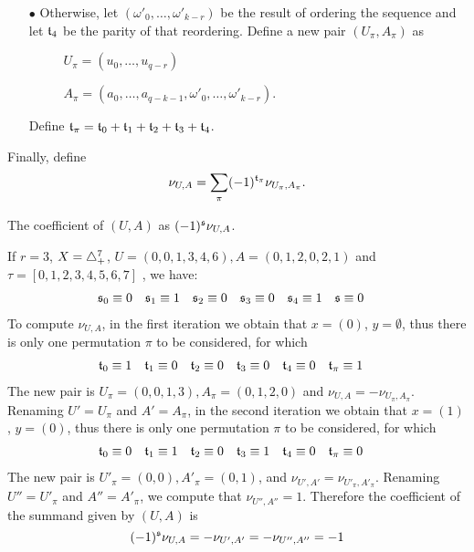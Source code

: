 \begin{itemize}
\begin{itemize}
\begin{itemize}
	\item[$\bullet$] Otherwise, let $(\omega'_0,\dots,\omega'_{k-r})$ be the result of ordering the sequence and let $\mathfrak{t}_4$ be the parity of that reordering. Define a new pair $(U_{\pi},A_{\pi})$ as
	\begin{itemize}
		\item[] $\quad U_{\pi} = (u_0,\dots,u_{q-r})$
		\item[] $\quad A_{\pi} = (a_0,\dots,a_{q-k-1},\omega'_0,\dots,\omega'_{k-r})$.
	\end{itemize}
Define $\mathfrak{t}_\pi = \mathfrak{t}_0+\mathfrak{t}_1+\mathfrak{t}_2+\mathfrak{t}_3+\mathfrak{t}_4$.
\end{itemize}
Finally, define
\[
	\nu_{U,A} = \sum_{\pi}(-1)^{\mathfrak{t}_\pi}\nu_{U_\pi,A_\pi}.
\]
\end{itemize}
\end{itemize}
The coefficient of $(U,A)$ as $(-1)^{\mathfrak{s}}\nu_{U,A}$.

\begin{example}\label{example:formulas1_3}
	If $r=3$, $X= \triangle_{+}^7$, $U = (0,0,1,3,4,6), A = (0,1,2,0,2,1)$ and $\tau = [0,1,2,3,4,5,6,7]$ , we have:
	\begin{align*}
		\mathfrak{s}_0 &\equiv 0
		&
		\mathfrak{s}_1 &\equiv 1
		&
		\mathfrak{s}_2 &\equiv 0
		&
		\mathfrak{s}_3 &\equiv 0
		&
		\mathfrak{s}_4 &\equiv 1
		&
		\mathfrak{s} &\equiv 0
	\end{align*}
	To compute $\nu_{U,A}$, in the first iteration we obtain that $x=(0)$, $y=\emptyset$, thus there is only one permutation $\pi$ to be considered, for which
	\begin{align*}
		\mathfrak{t}_0 &\equiv 1
		&
		\mathfrak{t}_1 &\equiv 0
		&
		\mathfrak{t}_2 &\equiv 0
		&
		\mathfrak{t}_3 &\equiv 0
		&
		\mathfrak{t}_4 &\equiv 0
		&
		\mathfrak{t}_{\pi} &\equiv 1
	\end{align*}
	The new pair is $U_{\pi} = (0,0,1,3), A_\pi = (0,1,2,0)$ and $\nu_{U,A} = -\nu_{U_\pi,A_\pi}$. Renaming $U'= U_\pi$ and $A'=A_\pi$, in the second iteration we obtain that $x=(1)$, $y=(0)$, thus there is only one permutation $\pi$ to be considered, for which
	\begin{align*}
		\mathfrak{t}_0 &\equiv 0
		&
		\mathfrak{t}_1 &\equiv 1
		&
		\mathfrak{t}_2 &\equiv 0
		&
		\mathfrak{t}_3 &\equiv 1
		&
		\mathfrak{t}_4 &\equiv 0
		&
		\mathfrak{t}_{\pi} &\equiv 0
	\end{align*}
	The new pair is $U'_{\pi} = (0,0), A'_\pi = (0,1)$, and $\nu_{U',A'} = \nu_{U'_\pi,A'_\pi}$. Renaming $U'' = U'_\pi$ and $A'' = A'_\pi$, we compute that $\nu_{U'',A''} = 1$. Therefore the coefficient of the summand given by $(U,A)$ is
	\[
		(-1)^{\mathfrak{s}} \nu_{U,A} = -\nu_{U',A'} = -\nu_{U'',A''} = -1
	\]
\end{example}

